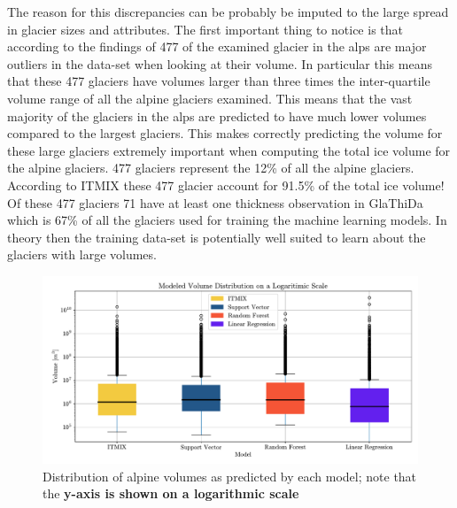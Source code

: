 The reason for this discrepancies can be probably be imputed to the large spread in glacier sizes and attributes. The first important thing to notice is that according to the findings of \citet{Farinotti2019} 477 of the examined glacier in the alps are major outliers in the data-set when looking at their volume. In particular this means that these 477 glaciers have volumes larger than three times the inter-quartile volume range of all the alpine glaciers examined. This means that the vast majority of the glaciers in the alps are predicted to have much lower volumes compared to the largest glaciers. This makes correctly predicting the volume for these large glaciers extremely important when computing the total ice volume for the alpine glaciers. 477 glaciers represent the 12\% of all the alpine glaciers. According to ITMIX these 477 glacier account for 91.5\% of the total ice volume! Of these 477 glaciers 71 have at least one thickness observation in GlaThiDa which is 67\% of all the glaciers used for training the machine learning models. In theory then the training data-set is potentially well suited to learn about the glaciers with large volumes.  

\begin{figure}[!tp]
	\centering		  
	\includegraphics[width=1.\textwidth]{figures/vol_box.pdf}
	\caption{Distribution of alpine volumes as predicted by each model; note that the \textbf{y-axis is shown on a logarithmic scale}}
	\label{fig:vol-dist}
\end{figure}

